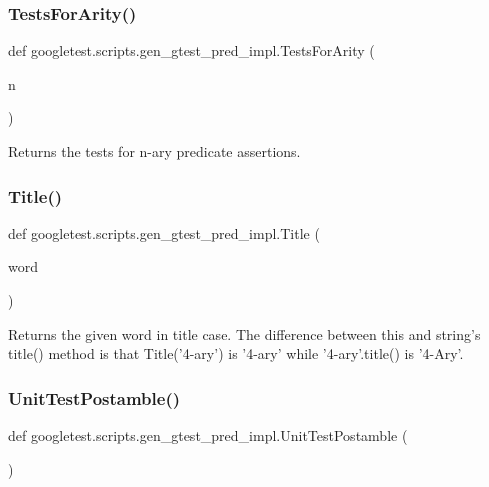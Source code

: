 \subsubsection{\texorpdfstring{TestsForArity()}{TestsForArity()}}
{\footnotesize\ttfamily def googletest.\+scripts.\+gen\+\_\+gtest\+\_\+pred\+\_\+impl.\+Tests\+For\+Arity (\begin{DoxyParamCaption}\item[{}]{n }\end{DoxyParamCaption})}

\begin{DoxyVerb}Returns the tests for n-ary predicate assertions.\end{DoxyVerb}
 \mbox{\label{namespacegoogletest_1_1scripts_1_1gen__gtest__pred__impl_a86d14c2f4656b60cefe4c3f556a1f325}} 
\subsubsection{\texorpdfstring{Title()}{Title()}}
{\footnotesize\ttfamily def googletest.\+scripts.\+gen\+\_\+gtest\+\_\+pred\+\_\+impl.\+Title (\begin{DoxyParamCaption}\item[{}]{word }\end{DoxyParamCaption})}

\begin{DoxyVerb}Returns the given word in title case.  The difference between
this and string's title() method is that Title('4-ary') is '4-ary'
while '4-ary'.title() is '4-Ary'.\end{DoxyVerb}
 \mbox{\label{namespacegoogletest_1_1scripts_1_1gen__gtest__pred__impl_a4c934c79a2247479224b01389fcd42bd}} 
\subsubsection{\texorpdfstring{UnitTestPostamble()}{UnitTestPostamble()}}
{\footnotesize\ttfamily def googletest.\+scripts.\+gen\+\_\+gtest\+\_\+pred\+\_\+impl.\+Unit\+Test\+Postamble (\begin{DoxyParamCaption}{ }\end{DoxyParamCaption})}

